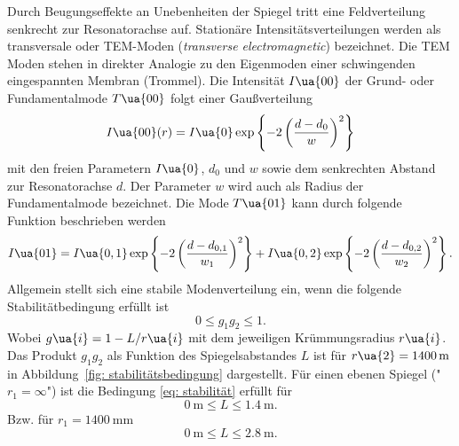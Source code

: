 Durch Beugungseffekte an Unebenheiten der Spiegel tritt eine Feldverteilung senkrecht zur Resonatorachse auf. Stationäre Intensitätsverteilungen
werden als transversale oder TEM-Moden (\textit{transverse electromagnetic}) bezeichnet. Die TEM Moden stehen in direkter Analogie zu den Eigenmoden
einer schwingenden eingespannten Membran (Trommel). Die Intensität $I\ua{00}$ der Grund- oder Fundamentalmode $T\ua{00}$ folgt einer Gaußverteilung
\begin{equation}
  I\ua{00}(r) = I\ua{0}\exp\left\{- 2\left(\frac{d-d_0}{w}\right)^2\right\}
  \label{eq: tem00}
\end{equation}
mit den freien Parametern $I\ua{0}$, $d_0$ und $w$ sowie dem senkrechten Abstand zur Resonatorachse $d$. Der Parameter $w$ wird auch als Radius
der Fundamentalmode bezeichnet. Die Mode $T\ua{01}$ kann durch folgende Funktion beschrieben werden
\begin{equation} %
  I\ua{01} = I\ua{0, 1}\exp\left\{- 2\left(\frac{d-d_{0, 1}}{w_{1}}\right)^2\right\} + I\ua{0, 2}\exp\left\{- 2\left(\frac{d-d_{0,2}}{w_{2}}\right)^2\right\}.
  \label{eq: tem01}
\end{equation}
Allgemein stellt sich eine stabile Modenverteilung
ein, wenn die folgende Stabilitätbedingung erfüllt ist
\begin{equation}
  0 \leq g_1 g_2 \leq 1.
  \label{eq: stabilität}
\end{equation}
Wobei $g\ua{i} = 1 - L/r\ua{i}$ mit dem jeweiligen Krümmungsradius $r\ua{i}$. Das Produkt $g_1g_2$
als Funktion des Spiegelsabstandes $L$ ist für $r\ua{2} = \SI{1400}{\meter}$ in Abbildung~\ref{fig: stabilitätsbedingung} dargestellt.
Für einen ebenen Spiegel ("$r_1 = \infty$") ist die Bedingung \eqref{eq: stabilität} erfüllt für
\begin{equation}
  \SI{0}{\meter}\leq L \leq \SI{1.4}{\meter}.
\end{equation}
Bzw. für $r_1 = \SI{1400}{\milli\meter}$
\begin{equation}
  \SI{0}{\meter} \leq L \leq \SI{2.8}{\meter}.
\end{equation}
